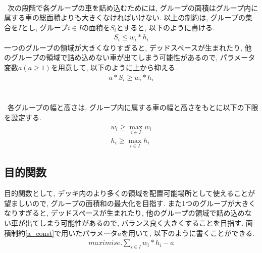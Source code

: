 \\
\ 次の段階で各グループの車を詰め込むためには, グループの面積はグループ内に属する車の総面積よりも大きくなければいけない. 
以上の制約は, グループの集合を$I$とし, グループ$i \in I$の面積を$S_i$とすると, 以下のように書ける. \\
\begin{eqnarray}
    S_i \leq w_i*h_i
\end{eqnarray}
一つのグループの領域が大きくなりすぎると, デッドスペースが生まれたり, 他のグループの領域で詰め込めない車が出てしまう可能性があるので, パラメータ変数$a (a \geq 1)$を用意して, 以下のように上から抑える. 
\begin{eqnarray}
    a*S_i \geq w_i*h_i
    \label{a_const}
\end{eqnarray}\\

\\
\ 各グループの幅と高さは, グループ内に属する車の幅と高さをもとに以下の下限を設定する. \\
\begin{eqnarray}
    w_i \geq \max_{i \in I} w_i \\
    h_i \geq \max_{i \in I} h_i
\end{eqnarray}

\subsection{目的関数}
目的関数として, デッキ内のより多くの領域を配置可能場所として使えることが望ましいので, グループの面積和の最大化を目指す. 
また1つのグループが大きくなりすぎると, デッドスペースが生まれたり, 他のグループの領域で詰め込めない車が出てしまう可能性があるので, バランス良く大きくすることを目指す. 
面積制約\ref{a_const}で用いたパラメータ$a$を用いて, 以下のように書くことができる. \\
\begin{eqnarray}
    maximise. \sum_{i \in I} w_i*h_i  - a
\end{eqnarray}
